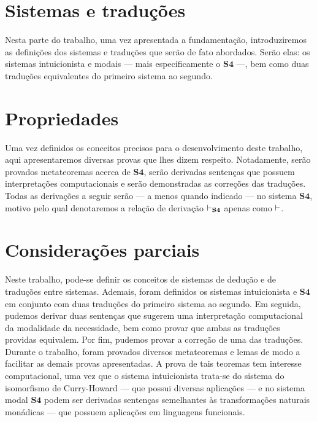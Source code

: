     \tableofcontents

    
    
    

    \chapter{Sistemas e traduções}

        Nesta parte do trabalho, uma vez apresentada a fundamentação, introduziremos as definições dos sistemas e traduções que serão de fato abordados. Serão elas: os sistemas intuicionista  e modais --- mais especificamente o $\mathbf{S4}$ ---, bem como duas traduções equivalentes do primeiro sistema ao segundo.

        
        
        

    \chapter{Propriedades}
        Uma vez definidos os conceitos precisos para o desenvolvimento deste trabalho, aqui apresentaremos diversas provas que lhes dizem respeito. Notadamente, serão provados metateoremas acerca de $\mathbf{S4}$, serão derivadas sentenças que possuem interpretações computacionais e serão demonstradas as correções das traduções. Todas as derivações a seguir serão --- a menos quando indicado --- no sistema $\mathbf{S4}$, motivo pelo qual denotaremos a relação de derivação $\mathrel{\vdash}_{\mathbf{S4}}$ apenas como $\mathrel{\vdash}$.

        
        
        
        

    \chapter{Considerações parciais}
        Neste trabalho, pode-se definir os conceitos de sistemas de dedução e de traduções entre sistemas. Ademais, foram definidos os sistemas intuicionista e $\mathbf{S4}$ em conjunto com duas traduções do primeiro sistema ao segundo. Em seguida, pudemos derivar duas sentenças que sugerem uma interpretação computacional da modalidade da necessidade, bem como provar que ambas as traduções providas equivalem. Por fim, pudemos provar a correção de uma das traduções. Durante o trabalho, foram provados diversos metateoremas e lemas de modo a facilitar as demais provas apresentadas. A prova de tais teoremas tem interesse computacional, uma vez que o sistema intuicionista trata-se do sistema do isomorfismo de Curry-Howard --- que possui diversas aplicações --- e no sistema modal $\mathbf{S4}$ podem ser derivadas sentenças semelhantes às transformações naturais monádicas --- que possuem aplicações em linguagens funcionais.

